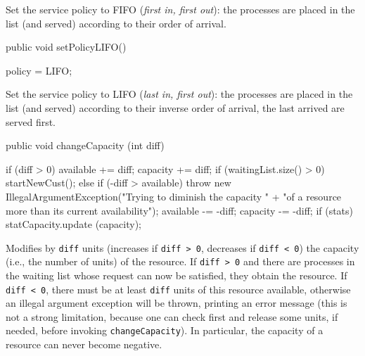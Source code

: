  \begin{tabb} Set the service policy to FIFO (\emph{first in, first out}): 
   the processes are placed in the
   list (and served) according to their order of arrival.
\end{tabb}
\begin{code}

   public void setPolicyLIFO()\begin{hide} {
      policy = LIFO;
   }\end{hide}
\end{code}
\begin{tabb} Set the service policy to LIFO (\emph{last in, first out}):
   the processes are placed in the
   list (and served) according to their inverse order of arrival,
   the last arrived are served first.
\end{tabb}
\begin{code}

   public void changeCapacity (int diff) \begin{hide} {
             if (diff > 0) {
                available += diff;
                capacity += diff;
                if (waitingList.size() > 0) startNewCust();
             }
             else {
                if (-diff > available) 
                   throw new IllegalArgumentException("Trying to diminish the capacity "
                         + "of a resource more than its current availability");
                available -= -diff;
                capacity -= -diff;
                }
                if (stats) statCapacity.update (capacity);
    }\end{hide}
\end{code}
\begin{tabb}  Modifies by \texttt{diff} units (increases if \texttt{diff > 0},
   decreases if \texttt{diff < 0}) the capacity (i.e., the number of units)
   of the resource.
   If \texttt{diff > 0} and there are processes in the waiting list whose
   request can now be satisfied, they obtain the resource.
   If \texttt{diff < 0}, there must be at least \texttt{diff} units of this
   resource available, otherwise an illegal argument exception will be thrown,
   printing an  error message (this is not a strong limitation, because one 
   can check first and release some units, if needed, before invoking 
   \texttt{changeCapacity}).
   In particular, the capacity of a resource can never become negative.
\end{tabb}
